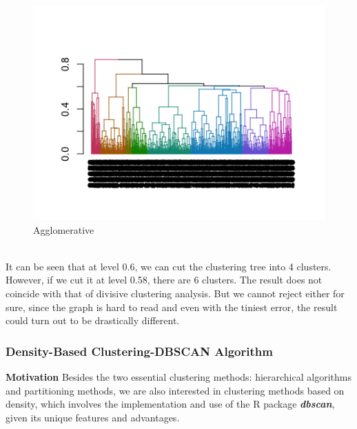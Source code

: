 \documentclass[a4paper,12pt,fleqn]{article}
\begin{document}
\begin{figure}[h]
	\centering
	\includegraphics[width=0.7\linewidth]{18.agglomerative}
	\caption{Agglomerative}
	\label{fig:18}
\end{figure}\\
It can be seen that at level 0.6, we can cut the clustering tree into 4 clusters. However, if we cut it at level 0.58, there are 6 clusters. The result does not coincide with that of divisive clustering analysis. But we cannot reject either for sure, since the graph is hard to read and even with the tiniest error, the result could turn out to be drastically different.\\

\subsubsection{Density-Based Clustering-DBSCAN Algorithm}
\textbf{Motivation}  Besides the two essential clustering methods: hierarchical algorithms and partitioning methods, we are also interested in clustering methods based on density, which involves the implementation and use of the R package \textbf{\textit{dbscan}}, given its unique features and advantages.
\end{document}
